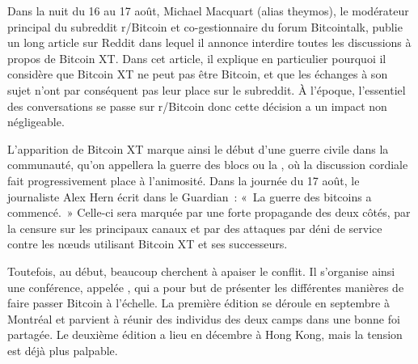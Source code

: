 Dans la nuit du 16 au 17 août, Michael Macquart (alias theymos), le modérateur principal du subreddit r/Bitcoin et co-gestionnaire du forum Bitcointalk, publie un long article sur Reddit dans lequel il annonce interdire toutes les discussions à propos de Bitcoin XT. Dans cet article, il explique en particulier pourquoi il considère que Bitcoin XT ne peut pas être Bitcoin, et que les échanges à son sujet n'ont par conséquent pas leur place sur le subreddit. À l'époque, l'essentiel des conversations se passe sur r/Bitcoin donc cette décision a un impact non négligeable.

L'apparition de Bitcoin XT marque ainsi le début d'une guerre civile dans la communauté, qu'on appellera la guerre des blocs ou la , où la discussion cordiale fait progressivement place à l'animosité. Dans la journée du 17 août, le journaliste Alex Hern écrit dans le Guardian~: «~La guerre des bitcoins a commencé.~» Celle-ci sera marquée par une forte propagande des deux côtés, par la censure sur les principaux canaux et par des attaques par déni de service contre les nœuds utilisant Bitcoin XT et ses successeurs.

Toutefois, au début, beaucoup cherchent à apaiser le conflit. Il s'organise ainsi une conférence, appelée , qui a pour but de présenter les différentes manières de faire passer Bitcoin à l'échelle. La première édition se déroule en septembre à Montréal et parvient à réunir des individus des deux camps dans une bonne foi partagée. Le deuxième édition a lieu en décembre à Hong Kong, mais la tension est déjà plus palpable.

